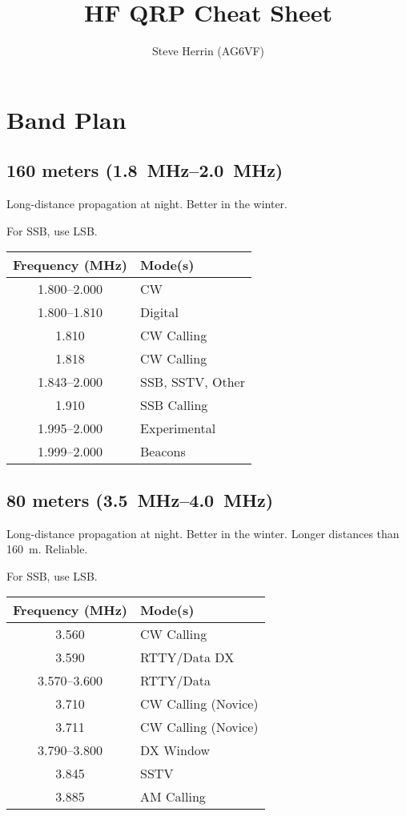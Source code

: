 \documentclass[11pt, twocolumn]{article}
\begin{document}
\title{HF QRP Cheat Sheet}
\author{Steve Herrin (AG6VF)}
\date{}
\maketitle
\newpage



\section{Band Plan}


\subsection{160 meters (\SIrange{1.8}{2.0}{\MHz})}
Long-distance propagation at night. Better in the winter.

For SSB, use LSB.
\begin{center}
  \begin{tabular}{S l}
    {Frequency (\si{\MHz})}	&	Mode(s)			\\
    \midrule
    \numrange{1.800}{2.000}	&	CW				\\
    \numrange{1.800}{1.810}	&	Digital			\\
    \num{1.810}				&	CW Calling		\\
    \num{1.818}				&	CW Calling		\\
    \numrange{1.843}{2.000}	&	SSB, SSTV, Other\\
    \num{1.910}				&	SSB Calling		\\
    \numrange{1.995}{2.000}	&	Experimental	\\
    \numrange{1.999}{2.000}	&	Beacons			\\
  \end{tabular}
\end{center}


\subsection{80 meters (\SIrange{3.5}{4.0}{\MHz})}
Long-distance propagation at night. Better in the winter.
Longer distances than \SI{160}{\m}. Reliable.

For SSB, use LSB.
\begin{center}
  \begin{tabular}{S l}
    {Frequency (\si{\MHz})}	&	Mode(s)					\\
    \midrule
    \num{3.560}				&	CW Calling				\\
    \num{3.590}				&	RTTY/Data DX			\\
    \numrange{3.570}{3.600}	&	RTTY/Data				\\
    \num{3.710}				&	CW Calling (Novice) 	\\
    \num{3.711}				&	CW Calling (Novice)		\\
    \numrange{3.790}{3.800}	&	DX Window				\\
    \num{3.845}				&	SSTV					\\
    \num{3.885}				&	AM Calling				\\
  \end{tabular}
\end{center}
\end{document}
